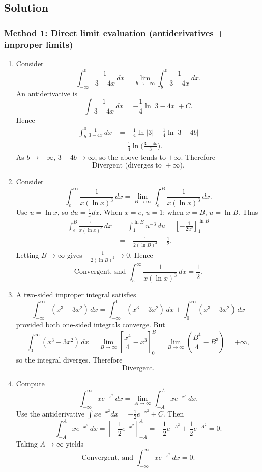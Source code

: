 \documentclass[12pt]{article}
\begin{document}
\subsection*{Solution}

\subsubsection*{Method 1: Direct limit evaluation (antiderivatives + improper limits)}

\begin{enumerate}[label=(\alph*)]
\item Consider
\[
\int_{-\infty}^{0}\frac{1}{3-4x}\,dx
=
\lim_{b\to -\infty}\int_{b}^{0}\frac{1}{3-4x}\,dx.
\]
An antiderivative is
\[
\int \frac{1}{3-4x}\,dx = -\frac14 \ln|3-4x| + C.
\]
Hence
\begin{align*}
\int_{b}^{0}\frac{1}{3-4x}\,dx
&=
-\frac14\ln|3|
+\frac14\ln|3-4b|\\
&=\frac14\ln\!\Big(\frac{3-4b}{3}\Big).
\end{align*}
As \(b\to-\infty\), \(3-4b\to\infty\), so the above tends to \(+\infty\). Therefore
\[
\boxed{\text{Divergent (diverges to }+\infty\text{).}}
\]

\item Consider
\[
\int_{e}^{\infty} \frac{1}{x(\ln x)^3}\,dx
=
\lim_{B\to\infty}\int_{e}^{B} \frac{1}{x(\ln x)^3}\,dx.
\]
Use \(u=\ln x\), so \(du=\frac{1}{x}dx\). When \(x=e\), \(u=1\); when \(x=B\), \(u=\ln B\). Thus
\begin{align*}
\int_{e}^{B} \frac{1}{x(\ln x)^3}\,dx
&= \int_{1}^{\ln B} u^{-3}\,du
= \left[-\frac{1}{2u^{2}}\right]_{1}^{\ln B}\\
&= -\frac{1}{2(\ln B)^2}+\frac12.
\end{align*}
Letting \(B\to\infty\) gives \(-\frac{1}{2(\ln B)^2}\to 0\). Hence
\[
\boxed{\text{Convergent, and } \displaystyle \int_{e}^{\infty} \frac{1}{x(\ln x)^3}\,dx=\frac12.}
\]

\item A two-sided improper integral satisfies
\[
\int_{-\infty}^{\infty} (x^3-3x^2)\,dx
=
\int_{-\infty}^{0}(x^3-3x^2)\,dx
+
\int_{0}^{\infty}(x^3-3x^2)\,dx
\]
provided both one-sided integrals converge. But
\[
\int_{0}^{\infty} (x^3-3x^2)\,dx
=
\lim_{B\to\infty}\left[\frac{x^4}{4}-x^3\right]_{0}^{B}
=
\lim_{B\to\infty}\left(\frac{B^4}{4}-B^3\right)=+\infty,
\]
so the integral diverges. Therefore
\[
\boxed{\text{Divergent.}}
\]

\item Compute
\[
\int_{-\infty}^{\infty} x e^{-x^2}\,dx
=
\lim_{A\to\infty}\int_{-A}^{A} x e^{-x^2}\,dx.
\]
Use the antiderivative \(\int x e^{-x^2}dx=-\tfrac12 e^{-x^2}+C\). Then
\[
\int_{-A}^{A} x e^{-x^2}\,dx
=
\left[-\frac12 e^{-x^2}\right]_{-A}^{A}
=
-\frac12 e^{-A^2} + \frac12 e^{-A^2} = 0.
\]
Taking \(A\to\infty\) yields
\[
\boxed{\text{Convergent, and } \displaystyle \int_{-\infty}^{\infty} x e^{-x^2}\,dx = 0.}
\]


\end{enumerate}
\end{document}
